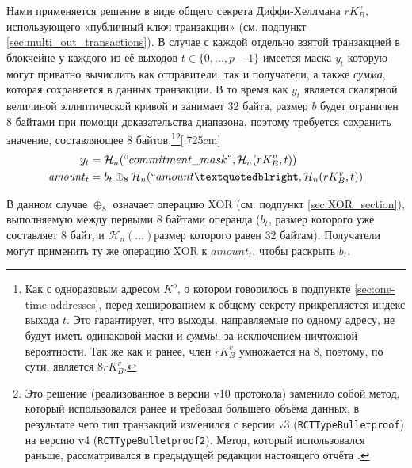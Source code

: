 Нами применяется решение в виде общего секрета Диффи-Хеллмана $r K_B^v$, использующего «публичный ключ транзакции» (см. подпункт \ref{sec:multi_out_transactions}). В случае с каждой отдельно взятой транзакцией в блокчейне у каждого из её выходов $t \in \{0, ..., p-1\}$ имеется маска $y_t$ которую могут приватно вычислить как отправители, так и получатели, а также {\em сумма}, которая сохраняется в данных транзакции. В то время как $y_t$ является скалярной величиной эллипти\-ческой кривой и занимает 32 байта, размер $b$ будет ограничен 8 байтами при помощи доказа\-тельства диапазона, поэтому требуется сохранить значение, составляющее 8 байтов.\footnote{Как с одноразовым адресом $K^o$, о котором говорилось в подпункте \ref{sec:one-time-addresses}, перед хешированием к общему секрету прикрепляется индекс выхода $t$. Это гарантирует, что выходы, направляемые по одному адресу, не будут иметь одинаковой маски и {\em суммы}, за исключением ничтожной вероятности. Так же как и ранее, член $r K^v_B$ умножается на 8, поэтому, по сути, является $8rK^v_B.$}\footnote{Это решение (реализованное в версии v10 протокола) заменило собой метод, который использовался ранее и требовал большего объёма данных, в результате чего тип транзакций изменился с версии v3 ({\tt RCTTypeBulletproof}) на версию v4 ({\tt RCTTypeBulletproof2}). Метод, который использовался раньше, рассматривался в предыдущей редакции настоящего отчёта \cite{ztm-1}.}[.725cm]\vspace{.175cm}%
\begin{align*}
  y_t &= \mathcal{H}_n(``commitment\_mask",\mathcal{H}_n(r K_B^v, t)) \\
  \mathit{amount}_t &= b_t \oplus_8 \mathcal{H}_n(``amount”, \mathcal{H}_n(r K_B^v, t))
\end{align*}

В данном случае $\oplus_8$ означает операцию XOR (см. подпункт \ref{sec:XOR_section}), выполняемую между первыми 8 байтами операнда ($b_t$, размер которого уже составляет 8 байт, и $\mathcal{H}_n(...)$размер которого равен 32 байтам). Получатели могут применить ту же операцию XOR к $\mathit{amount}_t$, чтобы раскрыть $b_t$.

